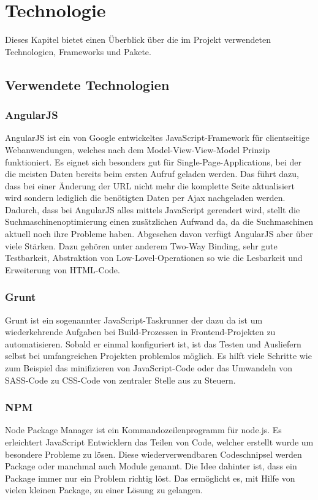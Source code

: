 \chapter{Technologie}
\label{chap_2}

Dieses Kapitel bietet einen Überblick über die im Projekt verwendeten Technologien, Frameworks und Pakete.

\section{Verwendete Technologien}
\subsection{AngularJS}
AngularJS ist ein von Google entwickeltes JavaScript-Framework für clientseitige Webanwendungen, welches nach dem Model-View-View-Model Prinzip funktioniert. Es eignet sich besonders gut für Single-Page-Applications, bei der die meisten Daten bereits beim ersten Aufruf geladen werden. Das führt dazu, dass bei einer Änderung der URL nicht mehr die komplette Seite aktualisiert wird sondern lediglich die benötigten Daten per Ajax nachgeladen werden. Dadurch, dass bei AngularJS alles mittels JavaScript gerendert wird, stellt die Suchmaschinenoptimierung einen zusätzlichen Aufwand da, da die Suchmaschinen aktuell noch ihre Probleme haben. Abgesehen davon verfügt AngularJS aber über viele Stärken. Dazu gehören unter anderem Two-Way Binding, sehr gute Testbarkeit, Abstraktion von Low-Lovel-Operationen so wie die Lesbarkeit und Erweiterung von HTML-Code. 

\subsection{Grunt}
Grunt ist ein sogenannter JavaScript-Taskrunner der dazu da ist um wiederkehrende Aufgaben bei Build-Prozessen in Frontend-Projekten zu automatisieren. Sobald er einmal konfiguriert ist, ist das Testen und Ausliefern selbst bei umfangreichen Projekten problemlos möglich. Es hilft viele Schritte wie zum Beispiel das minifizieren von JavaScript-Code oder das Umwandeln von SASS-Code zu CSS-Code von zentraler Stelle aus zu Steuern. 

\subsection{NPM}
Node Package Manager ist ein Kommandozeilenprogramm für node.js. Es erleichtert JavaScript Entwicklern das Teilen von Code, welcher erstellt wurde um besondere Probleme zu lösen. Diese wiederverwendbaren Codeschnipsel werden Package oder manchmal auch Module genannt. Die Idee dahinter ist, dass ein Package immer nur ein Problem richtig löst. Das ermöglicht es, mit Hilfe von vielen kleinen Package, zu einer Lösung zu gelangen.
  
